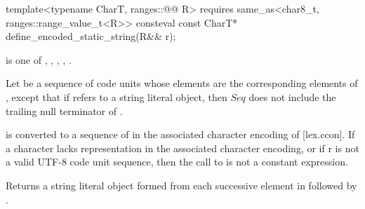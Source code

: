 \documentclass{wg21}
\begin{document}
\begin{addedblock}

%
\begin{itemdecl}
template<typename CharT, ranges::@@ R>
requires same_as<char8_t, ranges::range_value_t<R>>
consteval const CharT* define_encoded_static_string(R&& r);
\end{itemdecl}

\begin{itemdescr}

\mandates
{} is one of
,
,
,
,
.

Let  be a sequence of  code units
whose elements are the corresponding elements of ,
except that if  refers to a string literal object,
then $Seq$ does not include the trailing null terminator of .

 is converted to a sequence   of  in the associated character encoding of  [lex.ccon].
If a character lacks representation in the associated character encoding, or if r is not a valid UTF-8 code unit sequence, then the call to
 is not a constant expression.


\pnum
\effects
Returns a string literal object formed from each successive element in  followed by .
\end{itemdescr}

\end{addedblock}





\renewcommand{\section}[2]{}%

\begin{thebibliography}{9}



\end{thebibliography}
\end{document}
